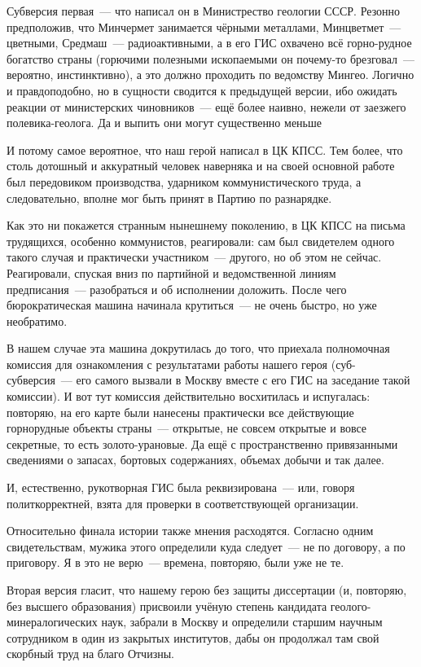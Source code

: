 Субверсия первая~--- что написал он в Министрество геологии СССР. Резонно предположив, что Минчермет занимается чёрными металлами, Минцветмет~--- цветными, Средмаш~--- радиоактивными, а в его ГИС охвачено всё горно-рудное богатство страны (горючими полезными ископаемыми он почему-то брезговал~--- вероятно, инстинктивно), а это должно проходить по ведомству Мингео. Логично и правдоподобно, но в сущности сводится к предыдущей версии, ибо ожидать реакции от министерских чиновников~--- ещё более наивно, нежели от заезжего полевика-геолога. Да и выпить они могут существенно меньше

И потому самое вероятное, что наш герой написал в ЦК КПСС. Тем более, что столь дотошный и аккуратный человек наверняка и на своей основной работе был передовиком производства, ударником коммунистического труда, а следовательно, вполне мог быть принят в Партию по разнарядке.

Как это ни покажется странным нынешнему поколению, в ЦК КПСС на письма трудящихся, особенно коммунистов, реагировали: сам был свидетелем одного такого случая и практически участником~--- другого, но об этом не сейчас. Реагировали, спуская вниз по партийной и ведомственной линиям предписания~--- разобраться и об исполнении доложить. После чего бюрократическая машина начинала крутиться~--- не очень быстро, но уже необратимо.

В нашем случае эта машина докрутилась до того, что приехала полномочная комиссия для ознакомления с результатами работы нашего героя (суб-субверсия~--- его самого вызвали в Москву вместе с его ГИС на заседание такой комиссии). И вот тут комиссия действительно восхитилась и испугалась: повторяю, на его карте были нанесены практически все действующие горнорудные объекты страны~--- открытые, не совсем открытые и вовсе секретные, то есть золото-урановые. Да ещё с пространственно привязанными сведениями о запасах, бортовых содержаниях, объемах добычи и так далее.

И, естественно, рукотворная ГИС была реквизирована~--- или, говоря политкорректней, взята для проверки в соответствующей организации.

Относительно финала истории также мнения расходятся. Согласно одним свидетельствам, мужика этого определили куда следует~--- не по договору, а по приговору. Я в это не верю~--- времена, повторяю, были уже не те.

Вторая версия гласит, что нашему герою без защиты диссертации (и, повторяю, без высшего образования) присвоили учёную степень кандидата геолого-минералогических наук, забрали в Москву и определили старшим научным сотрудником в один из закрытых институтов, дабы он продолжал там свой скорбный труд на благо Отчизны.

